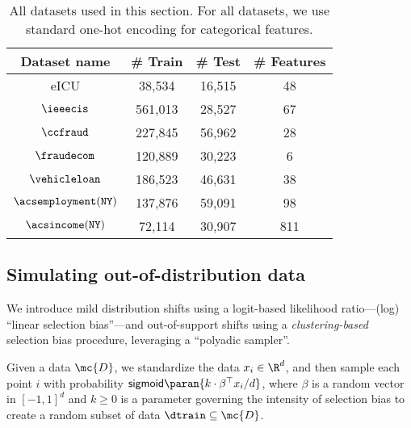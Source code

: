  
\begin{table}[h!]
\centering
\begin{tabular}{|c|c|c|c|}
\hline
\textbf{Dataset name} & \textbf{\# Train} & \textbf{\# Test} & \textbf{\# Features} \\ \hline
eICU & 38,534 & 16,515 & 48 \\ \hline
$\ieeecis$ & 561,013 & 28,527 & 67 \\ \hline
$\ccfraud$ & 227,845 & 56,962 & 28 \\ \hline
$\fraudecom$& 120,889 & 30,223 & 6 \\ \hline
$\vehicleloan$& 186,523 & 46,631 & 38 \\ \hline
$\acsemployment (\mathtt{NY})$ & 137,876 & 59,091 & 98 \\ \hline
$\acsincome (\mathtt{NY})$& 72,114 & 30,907 & 811 \\ \hline
\end{tabular}
\caption{All datasets used in this section. 
For all datasets, we use standard one-hot encoding for categorical features.}
\label{table:data-details}
\end{table}







\subsection{Simulating out-of-distribution data} \label{sec:selection-bias} 

We introduce mild distribution shifts using a logit-based likelihood ratio---(log) ``linear selection bias''---and out-of-support shifts using a \emph{clustering-based} selection bias procedure, leveraging a ``polyadic sampler''. 

 Given a data $\mc{D}$, we standardize the data $x_i \in \R^d$, and then sample each point $i$ with probability 
$\mathsf{sigmoid}\paran{k \cdot \beta^\top x_i/d}$,
 where $\beta$ is a random vector in $[-1,1]^d$ and $k \ge 0$ is a parameter governing the intensity of selection bias to create a random subset of data $\dtrain \subseteq \mc{D}$.


